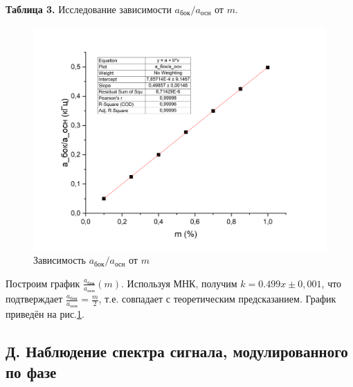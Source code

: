 \documentclass[a4paper,12pt]{article}
\theoremstyle{definition}
\begin{document}
\begin{enumerate}
\begin{center}
\textbf{Таблица 3.} Исследование зависимости $a_{\text{бок}}/a_{\text{осн}}$ от $m$.
\end{center}
\begin{figure}[h]
    \centering
    \includegraphics[width=0.7\linewidth]{grafic3.png}
    \caption{Зависимость $a_{\text{бок}}/a_{\text{осн}}$ от $m$}
    \label{grafic3}
\end{figure}
Построим график $\frac{a_{\text{бок}}}{a_{\text{осн}}}(m)$. Используя МНК, получим $k=0.499x\pm0,001$, что подтверждает $\frac{a_{\text{бок}}}{a_{\text{осн}}}=\frac{m}{2}$, т.е. совпадает с теоретическим предсказанием. График приведён на рис.\ref{grafic3}.




\end{enumerate}








\newpage



\subsection*{Д. Наблюдение спектра сигнала, модулированного по фазе}
\end{document}
